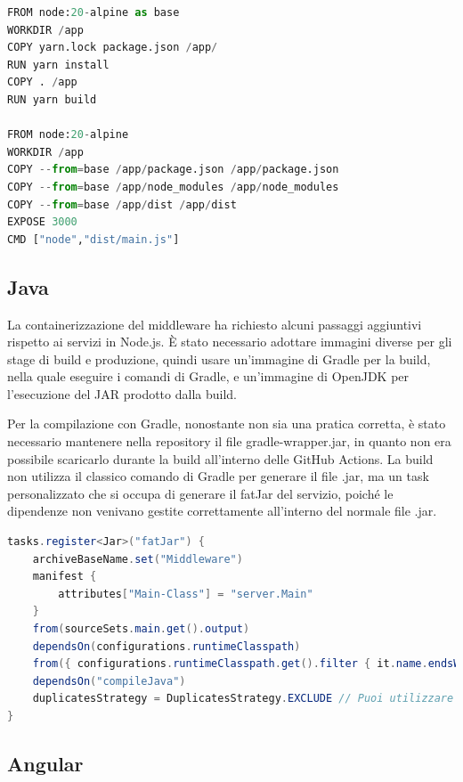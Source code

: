 \begin{lstlisting}[language=Python, caption={Dockerfile delle immagini NodeJS}, label=list:dockerfile_nodejs]
FROM node:20-alpine as base
WORKDIR /app
COPY yarn.lock package.json /app/
RUN yarn install
COPY . /app
RUN yarn build

FROM node:20-alpine
WORKDIR /app    
COPY --from=base /app/package.json /app/package.json
COPY --from=base /app/node_modules /app/node_modules
COPY --from=base /app/dist /app/dist
EXPOSE 3000
CMD ["node","dist/main.js"]
\end{lstlisting}

\subsection{Java}

La containerizzazione del middleware ha richiesto alcuni passaggi aggiuntivi rispetto ai servizi in Node.js.
È stato necessario adottare immagini diverse per gli stage di build e produzione, quindi usare un'immagine di Gradle per la build, nella quale eseguire i comandi di Gradle, e un'immagine di 
OpenJDK per l'esecuzione del JAR prodotto dalla build.

Per la compilazione con Gradle, nonostante non sia una pratica corretta, è stato necessario mantenere nella repository il file gradle-wrapper.jar, in quanto non era possibile scaricarlo durante la build all'interno delle GitHub Actions.
La build non utilizza il classico comando di Gradle per generare il file .jar, ma un task personalizzato che si occupa di generare il fatJar del servizio, poiché le dipendenze non venivano gestite correttamente all'interno del normale file .jar.

\begin{lstlisting}[language=Java, caption={Task del fatJar da includere nel container}, label=list:gradle_fatJar]
tasks.register<Jar>("fatJar") {
    archiveBaseName.set("Middleware")
    manifest {
        attributes["Main-Class"] = "server.Main"
    }
    from(sourceSets.main.get().output)
    dependsOn(configurations.runtimeClasspath)
    from({ configurations.runtimeClasspath.get().filter { it.name.endsWith("jar") }.map { zipTree(it) } })
    dependsOn("compileJava")
    duplicatesStrategy = DuplicatesStrategy.EXCLUDE // Puoi utilizzare altre strategie come DuplicatesStrategy.WARN per avvisare ma non fermare la build
}
\end{lstlisting}

\subsection{Angular}

